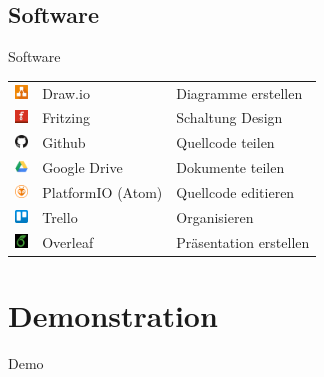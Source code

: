 \documentclass[mathserif,9pt]{article}
\begin{document}
    \subsection{Software}
    \begin{frame}{Software}
        \begin{block}{}
            \begin{tabular}{cll}
                \includegraphics[width=3.5mm]{img/drawio.png} & Draw.io & Diagramme erstellen \\
                \includegraphics[width=3.5mm]{img/fritzing.png} & Fritzing & Schaltung Design \\
                \includegraphics[width=3.5mm]{img/github.png} & Github & Quellcode teilen \\
                \includegraphics[width=3.5mm]{img/googledrive.png} & Google Drive & Dokumente teilen \\
                \includegraphics[width=3.5mm]{img/platformio.png} & PlatformIO (Atom) & Quellcode editieren \\
                \includegraphics[width=3.5mm]{img/trello.png} & Trello & Organisieren \\
                \includegraphics[width=3.5mm]{img/overleaf.png} & Overleaf & Präsentation erstellen %
            \end{tabular}
        \end{block}
    \end{frame}
    \section{Demonstration}
    \begin{frame}
        \begin{block}{}
            \centering
            {\fontsize{100}{120}\selectfont Demo}
        \end{block}
    \end{frame}
    
\end{document}
